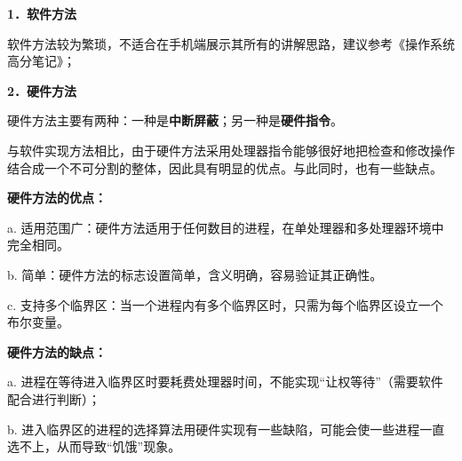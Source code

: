 \textbf{{{1．软件方法}\\
}}

{软件方法较为繁琐，不适合在手机端展示其所有的}讲解思路，建议参考《操作系统高分笔记》；

\textbf{{2．硬件方法}}

硬件方法主要有两种：一种是\textbf{中断屏蔽}；另一种是\textbf{硬件指令}。

与软件实现方法相比，由于硬件方法采用处理器指令能够很好地把检查和修改操作结合成一个不可分割的整体，因此具有明显的优点。与此同时，也有一些缺点。

{\textbf{硬件方法的优点：}}

{a.
适用范围广：}{硬件方法适用于任何数目的进程，在单处理器和多处理器环境中完全相同。}

{b. 简单：}{硬件方法的标志设置简单，含义明确，容易验证其正确性。}

{c.
支持多个临界区：}{当一个进程内}有多个临界区时，只需为每个临界区设立一个布尔变量。

\textbf{{硬件方法}{的缺点：}}

a.
进程在等待进入临界区时要耗费处理器时间，不能实现``让权等待''（需要软件配合进行判断）；

b.
进入临界区的进程的选择算法用硬件实现有一些缺陷，可能会使一些进程一直选不上，从而导致``饥饿''现象。
